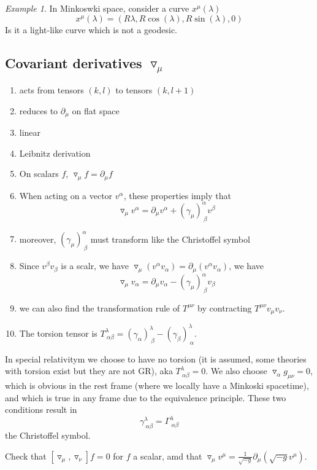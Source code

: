 \documentclass[a4paper]{book}
\theoremstyle{definition}
\theoremstyle{remark}
\newtheorem*{example}{Example}
\begin{document}
\begin{example}
    In Minkoswki space, consider a curve $x^\mu(\lambda)$
    \begin{equation}
        x^\mu(\lambda) = (R\lambda, R\cos(\lambda), R\sin(\lambda), 0)
    \end{equation}
    Is it a light-like curve which is not a geodesic.
\end{example}

\subsection{Covariant derivatives $\triangledown_\mu$}

\begin{enumerate}
    \item acts from tensors $(k,l)$ to tensors $(k, l+1)$
    \item reduces to $\partial_\mu$ on flat space
    \item linear 
    \item Leibnitz derivation 
    \item On scalars $f$, $\triangledown_\mu f = \partial_\mu f$
    \item When acting on a vector $v^\alpha$, these properties imply that 
        \begin{equation}
        \triangledown_\mu v^\alpha = \partial_\mu v^\alpha + (\gamma_\mu)^\alpha_{~\beta} v^\beta
        \end{equation}
    \item moreover, $(\gamma_\mu)^\alpha_{~\beta}$ must transform like the Christoffel symbol 
    \item Since $v^\beta v_\beta$ is a scalr, we have $\triangledown_\mu (v^\alpha v_\alpha) = \partial_\mu (v^\alpha v_\alpha)$, we have 
    \begin{equation}
        \triangledown_\mu v_\alpha = \partial_\mu v_\alpha - (\gamma_\mu)^\alpha_{~\beta} v_\beta
    \end{equation}
    \item we can also find the transformation rule of $T^{\mu\nu}$ by contracting $T^{\mu\nu}v_{\mu}v_\nu$. 
    \item The torsion tensor is $T^\lambda_{~\alpha\beta} = (\gamma_\alpha)^\lambda_{~\beta} - (\gamma_\beta)^\lambda_{~\alpha}$.
\end{enumerate}

In special relativitym we choose to have no torsion (it is assumed, some theories with torsion exist but they are not GR), aka $T^\lambda_{~\alpha\beta} = 0$. We also choose $\triangledown_\alpha g_{\mu\nu} = 0$, which is obvious in the rest frame (where we locally have a Minkoski spacetime), and which is true in any frame due to the equivalence principle. These two conditions result in 
\begin{equation}
    \gamma^\lambda_{~\alpha\beta} = \Gamma^\lambda_{~\alpha\beta}
\end{equation}
the Christoffel symbol. \par \bigskip 
Check that $[\triangledown_\mu, \triangledown_\nu]f = 0$ for $f$ a scalar, amd that $\triangledown_\mu v^\mu = \frac{1}{\sqrt{-g}}\partial_\mu (\sqrt{-g}v^\mu)$. \par \bigskip 
\end{document}
